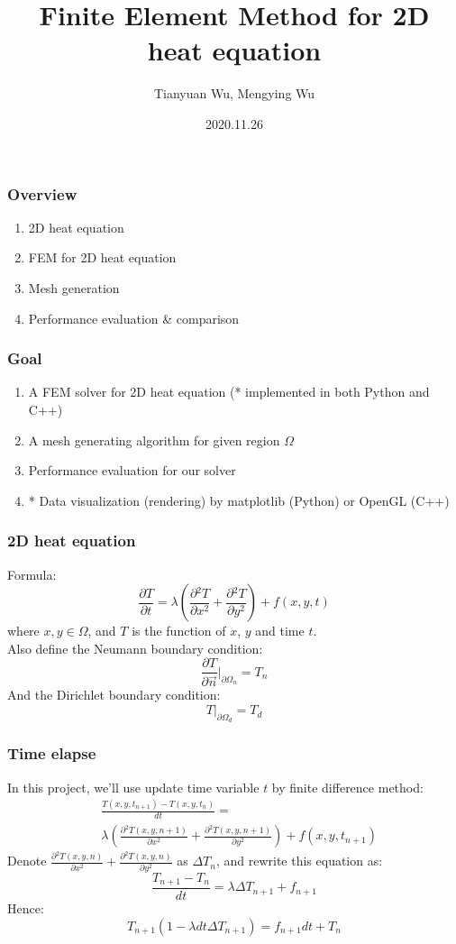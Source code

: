 \documentclass{beamer}
\title{Finite Element Method for 2D heat equation}
\author{Tianyuan Wu, Mengying Wu}
\institute{ShanghaiTech University}
\date{2020.11.26}
\begin{document}
\frame{\titlepage}

\begin{frame}
\frametitle{Overview}
\begin{enumerate}
    \item 2D heat equation
    \item FEM for 2D heat equation
    \item Mesh generation
    \item Performance evaluation \& comparison
\end{enumerate}
\end{frame}

\begin{frame}
    \frametitle{Goal}
    \begin{enumerate}
        \item A FEM solver for 2D heat equation (* implemented in both Python and C++)
        \item A mesh generating algorithm for given region $\Omega$
        \item Performance evaluation for our solver
        \item * Data visualization (rendering) by matplotlib (Python) or OpenGL (C++)
    \end{enumerate}
\end{frame}

\begin{frame}
    \frametitle{2D heat equation}
    Formula:
    $$\frac{\partial{T}}{\partial{t}} = \lambda(\frac{\partial {^2 T}}{\partial{x^2}} + \frac{\partial {^2 T}}{\partial{y^2}}) + f(x, y, t)$$
    where $x, y \in \Omega$, and $T$ is the function of $x$, $y$ and time $t$.\\
    Also define the Neumann boundary condition: 
    $$\frac{\partial{T}}{\partial{\vec{n}}}\big |_{\partial{\Omega_n}} = T_{n}$$
    And the Dirichlet boundary condition:
    $$T\big| _{\partial{\Omega_d}} = T_{d}$$
\end{frame}

\begin{frame}
    \frametitle{Time elapse}
    In this project, we'll use update time variable $t$ by finite difference method:
    \begin{equation}\nonumber
    \begin{aligned}
        & \frac{T(x,y, t_{n+1}) - T(x, y, t_{n})}{dt} =\\
        & \lambda(\frac{\partial {^2 T(x, y, n+1)}}{\partial{x^2}} + \frac{\partial {^2 T(x, y, n+1)}}{\partial{y^2}}) + f(x, y, t_{n+1})
    \end{aligned}
    \end{equation}
    Denote $\frac{\partial {^2 T(x, y, n)}}{\partial{x^2}} + \frac{\partial {^2 T(x, y, n)}}{\partial{y^2}}$ as $\Delta T_n$, 
    and rewrite this equation as:
    $$\frac{T_{n+1} - T_{n}}{dt} = \lambda \Delta T_{n+1} + f_{n+1}$$
    Hence:
    $$T_{n+1}(1 - \lambda dt\Delta T_{n+1}) = f_{n+1}dt + T_{n}$$
\end{frame}
\end{document}
